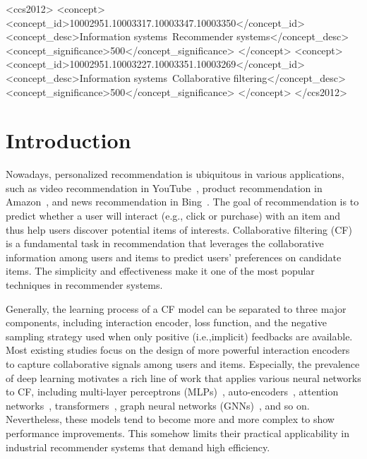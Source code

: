 \documentclass[sigconf,authorversion]{acmart}
\begin{document}
\begin{CCSXML}
<ccs2012>
<concept>
<concept_id>10002951.10003317.10003347.10003350</concept_id>
<concept_desc>Information systems~Recommender systems</concept_desc>
<concept_significance>500</concept_significance>
</concept>
<concept>
<concept_id>10002951.10003227.10003351.10003269</concept_id>
<concept_desc>Information systems~Collaborative filtering</concept_desc>
<concept_significance>500</concept_significance>
</concept>
</ccs2012>
\end{CCSXML}



\maketitle

\section{Introduction}
\label{sec::intro}






Nowadays, personalized recommendation is ubiquitous in various applications, such as video recommendation in YouTube~\cite{YouTubeNet}, product recommendation in Amazon~\cite{amazonrecsys}, and news recommendation in Bing~\cite{NPA}. The goal of recommendation is to predict whether a user will interact (e.g., click or purchase) with an item and thus help users discover potential items of interests. Collaborative filtering (CF)~\cite{CF_survey} is a fundamental task in recommendation that leverages the collaborative information among users and items to predict users' preferences on candidate items. The simplicity and effectiveness make it one of the most popular techniques in recommender systems.



Generally, the learning process of a CF model can be separated to three major components, including interaction encoder, loss function, and the negative sampling strategy used when only positive (i.e.,implicit) feedbacks are available. Most existing studies focus on the design of more powerful interaction encoders to capture collaborative signals among users and items. Especially, the prevalence of deep learning motivates a rich line of work that applies various neural networks to CF, including multi-layer perceptrons (MLPs)~\cite{NeuMF,YouTubeNet}, auto-encoders~\cite{MVAE}, attention networks~\cite{ACF}, transformers~\cite{transformerRec}, graph neural networks (GNNs)~\cite{LightGCN}, and so on. Nevertheless, these models tend to become more and more complex to show performance improvements. This somehow limits their practical applicability in industrial recommender systems that demand high efficiency. 
\end{document}
